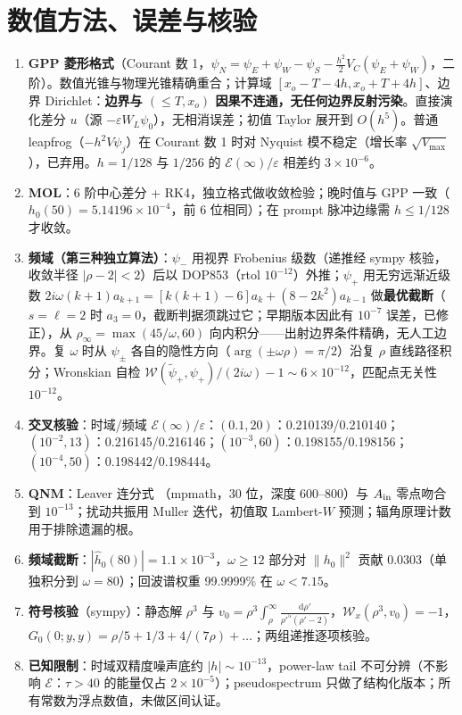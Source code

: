 \documentclass[11pt,a4paper,fontset=windows]{ctexart}
\theoremstyle{definition}
\theoremstyle{definition}
\newcommand{\eps}{\varepsilon}
\newcommand{\cE}{\mathcal E}
\newcommand{\cW}{\mathcal W}
\newcommand{\Ain}{A_{\rm in}}
\newcommand{\dd}{\mathrm d}
\begin{document}
\section{数值方法、误差与核验}
\begin{enumerate}[leftmargin=1.5em]
\item \textbf{GPP 菱形格式}（Courant 数 1，$\psi_N=\psi_E+\psi_W-\psi_S-\frac{h^2}{2}V_C(\psi_E+\psi_W)$，二阶）\cite{GPP}。数值光锥与物理光锥精确重合；计算域 $[x_o-T-4h,x_o+T+4h]$、边界 Dirichlet：\textbf{边界与 $(\le T,x_o)$ 因果不连通，无任何边界反射污染}。直接演化差分 $u$（源 $-\eps W_L\psi_0$），无相消误差；初值 Taylor 展开到 $O(h^5)$。普通 leapfrog（$-h^2V\psi_j$）在 Courant 数 1 时对 Nyquist 模不稳定（增长率 $\sqrt{V_{\max}}$），已弃用。$h=1/128$ 与 $1/256$ 的 $\cE(\infty)/\eps$ 相差约 $3\times10^{-6}$。
\item \textbf{MOL}：6 阶中心差分 + RK4，独立格式做收敛检验；晚时值与 GPP 一致（$h_0(50)=5.14196\times10^{-4}$，前 6 位相同）；在 prompt 脉冲边缘需 $h\le1/128$ 才收敛。
\item \textbf{频域（第三种独立算法）}：$\psi_-$ 用视界 Frobenius 级数（递推经 sympy 核验，收敛半径 $|\rho-2|<2$）后以 DOP853（rtol $10^{-12}$）外推；$\psi_+$ 用无穷远渐近级数 $2i\omega(k+1)a_{k+1}=[k(k+1)-6]a_k+(8-2k^2)a_{k-1}$ 做\textbf{最优截断}（$s=\ell=2$ 时 $a_3=0$，截断判据须跳过它；早期版本因此有 $10^{-7}$ 误差，已修正），从 $\rho_\infty=\max(45/\omega,60)$ 向内积分——出射边界条件精确，无人工边界。复 $\omega$ 时从 $\psi_\pm$ 各自的隐性方向（$\arg(\pm\omega\rho)=\pi/2$）沿复 $\rho$ 直线路径积分；Wronskian 自检 $\cW(\tilde\psi_+,\psi_+)/(2i\omega)-1\sim6\times10^{-12}$，匹配点无关性 $10^{-12}$。
\item \textbf{交叉核验}：时域/频域 $\cE(\infty)/\eps$：$(0.1,20)$：0.210139/0.210140；$(10^{-2},13)$：0.216145/0.216146；$(10^{-3},60)$：0.198155/0.198156；$(10^{-4},50)$：0.198442/0.198444。
\item \textbf{QNM}：Leaver 连分式 \cite{Leaver}（mpmath，30 位，深度 600--800）与 $\Ain$ 零点吻合到 $10^{-13}$；扰动共振用 Muller 迭代，初值取 Lambert-$W$ 预测；辐角原理计数用于排除遗漏的根。
\item \textbf{频域截断}：$|\hat h_0(80)|=1.1\times10^{-3}$，$\omega\ge12$ 部分对 $\|h_0\|^2$ 贡献 0.0303（单独积分到 $\omega=80$）；回波谱权重 99.9999\% 在 $\omega<7.15$。
\item \textbf{符号核验}（sympy）：静态解 $\rho^3$ 与 $v_0=\rho^3\int_\rho^\infty\frac{\dd\rho'}{\rho'^5(\rho'-2)}$，$\cW_x(\rho^3,v_0)=-1$，$G_0(0;y,y)=\rho/5+1/3+4/(7\rho)+\dots$；两组递推逐项核验。
\item \textbf{已知限制}：时域双精度噪声底约 $|h|\sim10^{-13}$，power-law tail 不可分辨（不影响 $\cE$：$\tau>40$ 的能量仅占 $2\times10^{-5}$）；pseudospectrum 只做了结构化版本；所有常数为浮点数值，未做区间认证。
\end{enumerate}
\end{document}

